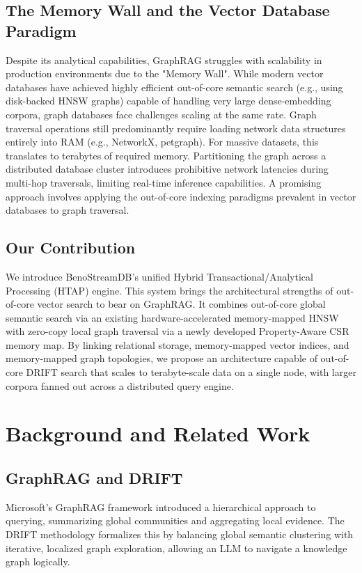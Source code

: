 \documentclass[11pt,twocolumn]{article}
\begin{document}
\subsection{The Memory Wall and the Vector Database Paradigm}
Despite its analytical capabilities, GraphRAG struggles with scalability in production environments due to the "Memory Wall". While modern vector databases have achieved highly efficient out-of-core semantic search (e.g., using disk-backed HNSW graphs) capable of handling very large dense-embedding corpora, graph databases face challenges scaling at the same rate. Graph traversal operations still predominantly require loading network data structures entirely into RAM (e.g., NetworkX, petgraph). For massive datasets, this translates to terabytes of required memory. Partitioning the graph across a distributed database cluster introduces prohibitive network latencies during multi-hop traversals, limiting real-time inference capabilities. A promising approach involves applying the out-of-core indexing paradigms prevalent in vector databases to graph traversal.

\subsection{Our Contribution}
We introduce BenoStreamDB's unified Hybrid Transactional/Analytical Processing (HTAP) engine. This system brings the architectural strengths of out-of-core vector search to bear on GraphRAG. It combines out-of-core global semantic search via an existing hardware-accelerated memory-mapped HNSW with zero-copy local graph traversal via a newly developed Property-Aware CSR memory map. By linking relational storage, memory-mapped vector indices, and memory-mapped graph topologies, we propose an architecture capable of out-of-core DRIFT search that scales to terabyte-scale data on a single node, with larger corpora fanned out across a distributed query engine.

\section{Background and Related Work}

\subsection{GraphRAG and DRIFT}
Microsoft's GraphRAG framework introduced a hierarchical approach to querying, summarizing global communities and aggregating local evidence. The DRIFT methodology formalizes this by balancing global semantic clustering with iterative, localized graph exploration, allowing an LLM to navigate a knowledge graph logically.
\end{document}
